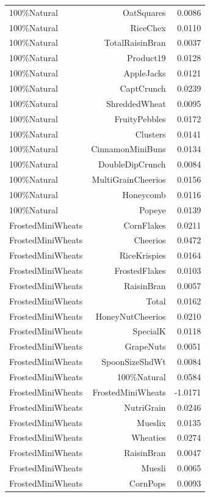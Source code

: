 \begin{longtable}{@{}lrr@{}}
100\%Natural & OatSquares & 0.0086 \\
100\%Natural & RiceChex & 0.0110 \\
100\%Natural & TotalRaisinBran & 0.0037 \\
100\%Natural & Product19 & 0.0128 \\
100\%Natural & AppleJacks & 0.0121 \\
100\%Natural & CaptCrunch & 0.0239 \\
100\%Natural & ShreddedWheat & 0.0095 \\
100\%Natural & FruityPebbles & 0.0172 \\
100\%Natural & Clusters & 0.0141 \\
100\%Natural & CinnamonMiniBuns & 0.0134 \\
100\%Natural & DoubleDipCrunch & 0.0084 \\
100\%Natural & MultiGrainCheerios & 0.0156 \\
100\%Natural & Honeycomb & 0.0116 \\
100\%Natural & Popeye & 0.0139 \\
FrostedMiniWheats & CornFlakes & 0.0211 \\
FrostedMiniWheats & Cheerios & 0.0472 \\
FrostedMiniWheats & RiceKrispies & 0.0164 \\
FrostedMiniWheats & FrostedFlakes & 0.0103 \\
FrostedMiniWheats & RaisinBran & 0.0057 \\
FrostedMiniWheats & Total & 0.0162 \\
FrostedMiniWheats & HoneyNutCheerios & 0.0210 \\
FrostedMiniWheats & SpecialK & 0.0118 \\
FrostedMiniWheats & GrapeNuts & 0.0051 \\
FrostedMiniWheats & SpoonSizeShdWt & 0.0084 \\
FrostedMiniWheats & 100\%Natural & 0.0584 \\
FrostedMiniWheats & FrostedMiniWheats & -1.0171 \\
FrostedMiniWheats & NutriGrain & 0.0246 \\
FrostedMiniWheats & Mueslix & 0.0135 \\
FrostedMiniWheats & Wheaties & 0.0274 \\
FrostedMiniWheats & RaisinBran & 0.0047 \\
FrostedMiniWheats & Muesli & 0.0065 \\
FrostedMiniWheats & CornPops & 0.0093 \\

\end{longtable}
